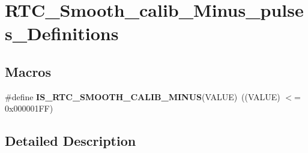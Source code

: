 \hypertarget{group___r_t_c___smooth__calib___minus__pulses___definitions}{\section{R\-T\-C\-\_\-\-Smooth\-\_\-calib\-\_\-\-Minus\-\_\-pulses\-\_\-\-Definitions}
\label{group___r_t_c___smooth__calib___minus__pulses___definitions}
}
\subsection*{Macros}
\begin{DoxyCompactItemize}
\item 
\hypertarget{group___r_t_c___smooth__calib___minus__pulses___definitions_ga257f8bd6835bee480a80416bf086e200}{\#define {\bfseries I\-S\-\_\-\-R\-T\-C\-\_\-\-S\-M\-O\-O\-T\-H\-\_\-\-C\-A\-L\-I\-B\-\_\-\-M\-I\-N\-U\-S}(V\-A\-L\-U\-E)~((V\-A\-L\-U\-E) $<$= 0x000001\-F\-F)}\label{group___r_t_c___smooth__calib___minus__pulses___definitions_ga257f8bd6835bee480a80416bf086e200}

\end{DoxyCompactItemize}


\subsection{Detailed Description}
